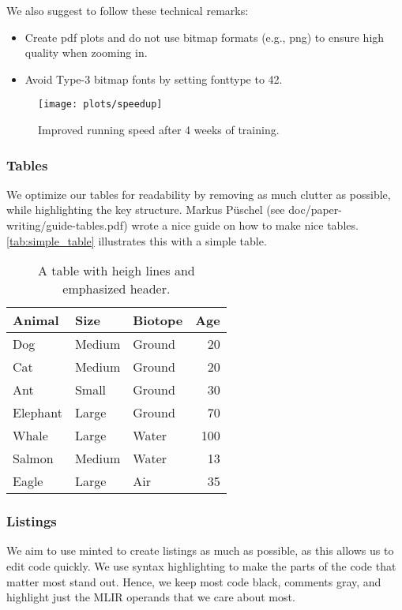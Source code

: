 \documentclass[sigplan]{acmart}
\newenvironment{draftonly}{}{}
\newcommand{\ra}[1]{\renewcommand{\arraystretch}{#1}}
\begin{document}
\begin{draftonly}
\noindent
We also suggest to follow these technical remarks:
\begin{itemize}
  \item Create pdf plots and do not use bitmap formats (e.g., png) to
	ensure high quality when zooming in.
  \item Avoid Type-3 bitmap fonts by
	setting fonttype to 42.
\end{itemize}

\begin{figure}
\texttt{[image: plots/speedup]}
\caption{Improved running speed after 4 weeks of training.
}
\label{fig:speedup}
\end{figure}

\subsubsection{Tables} We optimize our tables for readability by removing as
much clutter as possible, while highlighting the key structure. Markus Püschel
(see doc/paper-writing/guide-tables.pdf) wrote a nice guide on how to make nice
tables. \autoref{tab:simple_table} illustrates this with a simple
table.

\begin{table}
\ra{1.2}
\centering
\begin{tabular}{l l l r}
  \toprule
  \textbf{Animal} & \textbf{Size} & \textbf{Biotope} & \textbf{Age}\\
  \midrule
  Dog & Medium & Ground & 20\\
  Cat & Medium & Ground &20 \\
  Ant & Small & Ground & 30 \\
  Elephant & Large & Ground & 70\\
  Whale & Large & Water & 100\\
  Salmon & Medium & Water & 13 \\
  Eagle & Large & Air & 35 \\
  \bottomrule
\end{tabular}
\vspace{1em}
\caption{A table with heigh lines and emphasized header.}
\label{tab:simple_table}
\end{table}

\subsubsection{Listings} We aim to use minted to create listings as much as
possible, as this allows us to edit code quickly. We use syntax highlighting
to make the parts of the code that matter most stand out. Hence, we keep
most code black, comments gray, and highlight just the MLIR operands that
we care about most.


\end{draftonly}
\end{document}
